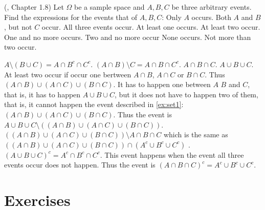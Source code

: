 \documentclass[12pt]{article}
\newcommand{\<}{{\langle \!\! \langle}}
\renewcommand{\>}{{\rangle \!\! \rangle}}
\begin{document}
\begin{ExerciseList}
	\Exercise (\cite{Feller}, Chapter 1.8) Let $\Omega$ be a sample space and $A,B, C$ be three arbitrary events. Find the expressions for the events that of $A,B,C$:
        \Question Only $A$ occurs.
	\Question  Both $A$ and $B$, but not $C$ occur. 
	\Question  All three events occur. 
	\Question  At least one occurs.
	\Question  At least two occur. 
	\Question  One and no more occurs.
	\Question  Two and no more occur 
	\Question  None occurs. 
	\Question  Not more than two occur.
	
	\Answer

	\Question	$A\setminus (B\cup C)=A\cap B^c \cap C^c$.
	\Question	$ (A\cap B)\setminus C = A\cap B \cap C^c$.
	\Question	$ A\cap B \cap C$.
	\Question	$ A\cup B \cup C$.
	\Question	\label{ex:set1} At least two occur if occur one bertween $A\cap B$, $A\cap C$ or $B\cap C$. Thus $ (A \cap B)\cup (A\cap C) \cup ( B \cap C)$. 
        \Question        It has to happen one between $A$ $B$ and $C$, that is, it has to happen $A\cup B \cup C$, but it does not have to happen two of them, that is, it cannot happen the event described in \ref{ex:set1}: 
	\Question	  $ (A \cap B)\cup (A\cap C) \cup ( B \cap C)$. Thus the event is $A\cup B \cup C \setminus ((A \cap B)\cup (A\cap C) \cup ( B \cap C))$.
	\Question	$ \left((A \cap B) \cup (A \cap C) \cup (B \cap C) \right)\setminus A \cap B \cap C $ which is the same as  $ \left((A \cap B) \cup (A \cap C) \cup (B \cap C) \right) \cap (A^c \cup B^c \cup  C^c) $ .
	\Question	$(A\cup B \cup C)^c= A^c\cap B^c \cap C^c$. 
	\Question	This event happens when the event all three events occur does not happen. Thus the event is $(A \cap B \cap C)^c =A^c \cup B^c \cup C^c. $

\end{ExerciseList}

\section{Exercises}
\end{document}
